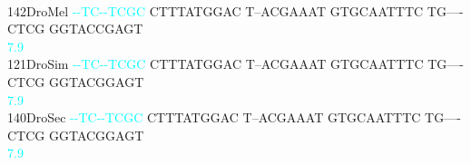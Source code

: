 \documentclass[11pt,twoside,reqno,a4paper]{article}
\begin{document}
{\\
142\hspace*{1\charwidth}DroMel	\textcolor{cyan}{-}\textcolor{cyan}{-}\textcolor{cyan}{T}\textcolor{cyan}{C}\textcolor{cyan}{-}\textcolor{cyan}{-}\textcolor{cyan}{T}\textcolor{cyan}{C}\textcolor{cyan}{G}\textcolor{cyan}{C}	CTTTATGGAC	T--ACGAAAT	GTGCAATTTC	TG----CTCG	GGTACCGAGT	\\
\hspace*{4\charwidth}\hspace*{7\charwidth}\hspace*{0\charwidth}\textcolor{cyan}{7.9}\hspace*{1\charwidth}\hspace*{1\charwidth}\hspace*{1\charwidth}\hspace*{1\charwidth}\hspace*{1\charwidth}\hspace*{1\charwidth}\\
121\hspace*{1\charwidth}DroSim	\textcolor{cyan}{-}\textcolor{cyan}{-}\textcolor{cyan}{T}\textcolor{cyan}{C}\textcolor{cyan}{-}\textcolor{cyan}{-}\textcolor{cyan}{T}\textcolor{cyan}{C}\textcolor{cyan}{G}\textcolor{cyan}{C}	CTTTATGGAC	T--ACGAAAT	GTGCAATTTC	TG----CTCG	GGTACGGAGT	\\
\hspace*{4\charwidth}\hspace*{7\charwidth}\hspace*{0\charwidth}\textcolor{cyan}{7.9}\hspace*{1\charwidth}\hspace*{1\charwidth}\hspace*{1\charwidth}\hspace*{1\charwidth}\hspace*{1\charwidth}\hspace*{1\charwidth}\\
140\hspace*{1\charwidth}DroSec	\textcolor{cyan}{-}\textcolor{cyan}{-}\textcolor{cyan}{T}\textcolor{cyan}{C}\textcolor{cyan}{-}\textcolor{cyan}{-}\textcolor{cyan}{T}\textcolor{cyan}{C}\textcolor{cyan}{G}\textcolor{cyan}{C}	CTTTATGGAC	T--ACGAAAT	GTGCAATTTC	TG----CTCG	GGTACGGAGT	\\
\hspace*{4\charwidth}\hspace*{7\charwidth}\hspace*{0\charwidth}\textcolor{cyan}{7.9}\hspace*{1\charwidth}\hspace*{1\charwidth}\hspace*{1\charwidth}\hspace*{1\charwidth}\hspace*{1\charwidth}\hspace*{1\charwidth}\\
}
\end{document}
